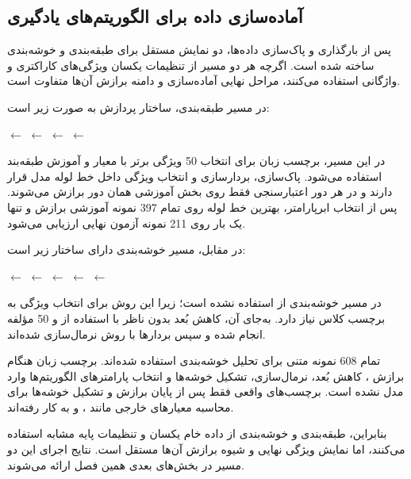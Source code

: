 \documentclass[12pt,a4paper,oneside]{report}
\begin{document}
\subsection{آماده‌سازی داده برای الگوریتم‌های یادگیری}

پس از بارگذاری و پاک‌سازی داده‌ها، دو نمایش مستقل برای طبقه‌بندی و خوشه‌بندی ساخته شده است. اگرچه هر دو مسیر از تنظیمات یکسان ویژگی‌های کاراکتری و واژگانی
استفاده می‌کنند، مراحل نهایی آماده‌سازی و دامنه برازش آن‌ها متفاوت است.

در مسیر طبقه‌بندی، ساختار پردازش به صورت زیر است:

\begin{center}
$\longleftarrow$
$\longleftarrow$
$\longleftarrow$
$\longleftarrow$
\end{center}

در این مسیر، برچسب زبان برای انتخاب 50 ویژگی برتر با معیار
و آموزش طبقه‌بند استفاده می‌شود. پاک‌سازی، بردارسازی و انتخاب ویژگی داخل خط لوله مدل قرار دارند و در هر دور اعتبارسنجی فقط روی بخش آموزشی همان دور برازش می‌شوند. پس از انتخاب ابرپارامتر، بهترین خط لوله روی تمام 397 نمونه آموزشی برازش و تنها یک بار روی 211 نمونه آزمون نهایی ارزیابی می‌شود.

در مقابل، مسیر خوشه‌بندی دارای ساختار زیر است:

\begin{center}
$\longleftarrow$
$\longleftarrow$
$\longleftarrow$
$\longleftarrow$
$\longleftarrow$
\end{center}

در مسیر خوشه‌بندی از
استفاده نشده است؛ زیرا این روش برای انتخاب ویژگی به برچسب کلاس نیاز دارد. به‌جای آن، کاهش بُعد بدون ناظر با استفاده از
و 50 مؤلفه انجام شده و سپس بردارها با روش
نرمال‌سازی شده‌اند.

تمام 608 نمونه متنی برای تحلیل خوشه‌بندی استفاده شده‌اند. برچسب زبان هنگام برازش
،
کاهش بُعد، نرمال‌سازی، تشکیل خوشه‌ها و انتخاب پارامترهای الگوریتم‌ها وارد مدل نشده است. برچسب‌های واقعی فقط پس از پایان برازش و تشکیل خوشه‌ها برای محاسبه معیارهای خارجی مانند
،
و
به کار رفته‌اند.

بنابراین، طبقه‌بندی و خوشه‌بندی از داده خام یکسان و تنظیمات پایه مشابه
استفاده می‌کنند، اما نمایش ویژگی نهایی و شیوه برازش آن‌ها مستقل است. نتایج اجرای این دو مسیر در بخش‌های بعدی همین فصل ارائه می‌شوند.
\end{document}
